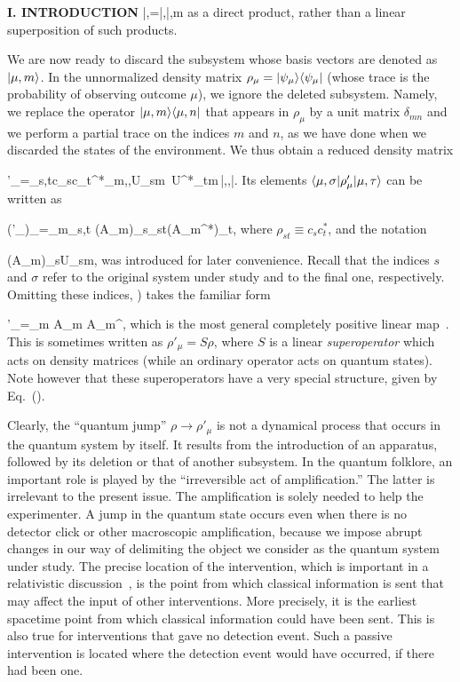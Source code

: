 \begin{center}{\bf I. INTRODUCTION}
\beq |\mu,\xi\9=|\mu,\sigma\9\0|\mu,m\9 \eeq
as a direct product, rather than a linear superposition of such
products.

We are now ready to discard the subsystem whose basis vectors are
denoted as $|\mu,m\rangle$. In the unnormalized density matrix $\rho_\mu=
|\psi_\mu\rangle\langle\psi_\mu|$ (whose trace is the probability of observing
outcome $\mu$), we ignore the deleted subsystem. Namely, we replace the
operator $|\mu,m\rangle\langle\mu,n|$ that appears in $\rho_\mu$ by a unit matrix
$\delta_{mn}$ and we perform a partial trace on the indices $m$ and $n$,
as we have done when we discarded the states of the environment. We thus
obtain a reduced density matrix

\beq \rho'_\mu=\sum_{s,t}c_sc_t^*\sum_{m,\sigma,\tau}U_{s\mu\sigma m}\,
 U^*_{t\mu\tau m}\,|\mu,\sigma\9\6\mu,\tau|. \eeq
Its elements $\langle\mu,\sigma|\rho'_\mu|\mu,\tau\rangle$ can be written as

\beq (\rho'_\mu)_{\sigma\tau}=\sum_{m}\sum_{s,t}
 (A_{\mu m})_{\sigma s}\;\rho_{st}\;(A_{\mu m}^*)_{\tau t},
 \label{rhomu} \eeq
where $\rho_{st}\equiv c_sc_t^*$, and the notation

\beq (A_{\mu m})_{\sigma s}\equiv U_{s\mu\sigma m}, \label{AU}\eeq
was introduced for later convenience. Recall that the indices $s$ and
$\sigma$ refer to the original system under study and to the final one,
respectively. Omitting these indices, ) takes the familiar
form

\beq \rho'_\mu=\sum_{m} A_{\mu m}\,\rho\,A_{\mu m}^\dagger,
 \label{ArhoA} \eeq
which is the most general completely positive linear map~\cite{choi}.
This is sometimes written as $\rho'_\mu=S\rho$, where $S$ is a linear
{\it super\-operator\/} which acts on density matrices (while an
ordinary operator acts on quantum states). Note however that these
super\-operators have a very special structure, given by
Eq.~(\theequation).

Clearly, the ``quantum jump'' $\rho\to\rho'_\mu$ is not a dynamical
process that occurs in the quantum system by itself. It results from the
introduction of an apparatus, followed by its deletion or that of
another subsystem. In the quantum folklore, an important role is played
by the ``irreversible act of amplification.'' The latter is irrelevant
to the present issue. The amplification is solely needed to help the
experimenter. A jump in the quantum state occurs even when there is no
detector click or other macroscopic amplification, because we impose
abrupt changes in our way of delimiting the object we consider as the
quantum system under study. The precise location of the intervention,
which is important in a relativistic discussion~\cite{II}, is the point
from which classical information is sent that may affect the input of
other interventions. More precisely, it is the earliest spacetime point
from which classical information could have been sent. This is also true
for interventions that gave no detection event. Such a passive
intervention is located where the detection event would have occurred,
if there had been one.


\end{center}
